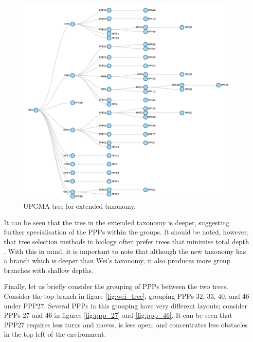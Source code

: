 \documentclass[authoryearcitations]{UoYCSproject}
\begin{document}
\begin{figure}
\graphicspath{ {EvalPics/} }
\includegraphics[scale=0.5]{new_tree.png}
\caption{UPGMA tree for extended taxonomy.}
\label{fig:new_tree}
\end{figure}

It can be seen that the tree in the extended taxonomy is deeper, suggesting further specialisation of the PPPs within the groups. It should be noted, however, that tree selection methods in biology often prefer trees that minimise total depth \cite[chapter 11 p.415]{phylo}. With this in mind, it is important to note that although the new taxonomy has a branch which is deeper than Wei's taxonomy, it also produces more group branches with shallow depths.

Finally, let us briefly consider the grouping of PPPs between the two trees. Consider the top branch in figure \ref{fig:wei_tree}, grouping PPPs 32, 33, 40, and 46 under PPP27. Several PPPs in this grouping have very different layouts; consider PPPs 27 and 46 in figures \ref{fig:ppp_27} and \ref{fig:ppp_46}. It can be seen that PPP27 requires less turns and moves, is less open, and concentrates less obstacles in the top left of the environment.
\end{document}

